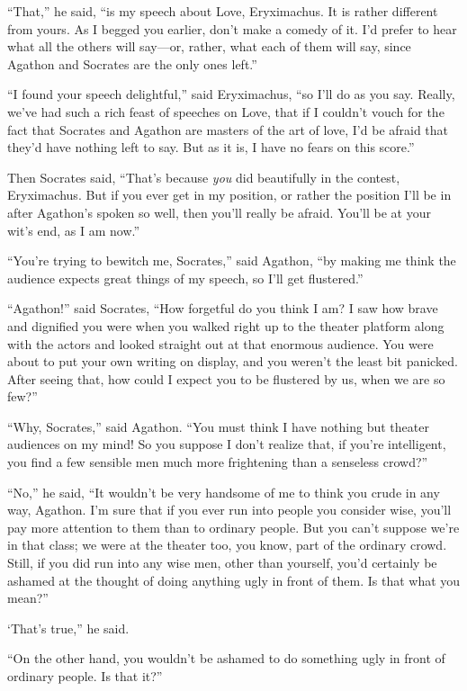 “That,” he said, “is my speech about Love, Eryximachus. It is rather
different from yours. As I begged you earlier, don’t make a comedy of
it.  I’d prefer to hear what all the others will say---or,
rather, what each of them will say, since Agathon and Socrates are the
only ones left.”

“I found your speech delightful,” said Eryximachus, “so I’ll do as you
say. Really, we’ve had such a rich feast of speeches on Love, that if I
couldn’t vouch for the fact that Socrates and Agathon are masters of the
art of love, I’d be afraid that they’d have nothing left to say. But as
it is, I have no fears on this score.”

 Then Socrates said, “That’s because {\em you} did
beautifully in the contest, Eryximachus. But if you ever get in my
position, or rather the position I’ll be in after Agathon’s spoken so
well, then you’ll really be afraid. You’ll be at your wit’s end, as I am
now.”

“You’re trying to bewitch me, Socrates,” said Agathon, “by making me
think the audience expects great things of my speech, so I’ll get
flustered.” 

“Agathon!” said Socrates, “How forgetful do you think I am? I saw how
brave and dignified you were when you walked right up to the theater
platform along with the actors and looked straight out at that enormous
audience. You were about to put your own writing on display, and you
weren’t the least bit panicked. After seeing that, how could I expect
you to be flustered by us, when we are so few?”

“Why, Socrates,” said Agathon. “You must think I have nothing but
theater audiences on my mind! So you suppose I don’t realize that, if
you’re intelligent, you find a few sensible men much more frightening
than a senseless crowd?”

“No,” he said, “It wouldn’t be very handsome of me to think you crude
 in any way, Agathon. I’m sure that if you ever run into people
you consider wise, you’ll pay more attention to them than to ordinary
people. But you can’t suppose we’re in that class; we were at the
theater too, you know, part of the ordinary crowd. Still, if you did run
into any wise men, other than yourself, you’d certainly be ashamed at
the thought of doing anything ugly in front of them. Is that what you
mean?”

‘That’s true,” he said.

“On the other hand, you wouldn’t be ashamed to do something ugly 
in front of ordinary people. Is that it?”

